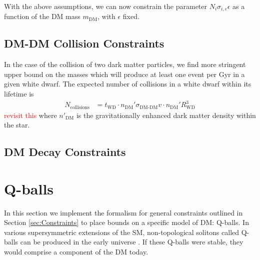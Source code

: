 \documentclass[twocolumn,showpacs,preprintnumbers,amsmath,amssymb,prd]{revtex4}
\begin{document}
With the above assumptions, we can now constrain the parameter $N_i \sigma_{i,\epsilon} \epsilon$ as a function of the DM mass $m_\text{DM}$, with $\epsilon$ fixed. 


\subsection{DM-DM Collision Constraints}
\label{sec:CollisionConstraints}

In the case of the collision of two dark matter particles, we find more stringent upper bound on the masses which will produce at least one event per Gyr in a given white dwarf. The expected number of collisions in a white dwarf within its lifetime is
\begin{align}
N_\text{collisions}  &= t_\text{WD} \cdot n_\text{DM}' \sigma_\text{DM-DM} v \cdot n_\text{DM}'R_\text{WD}^3
\end{align}
\textcolor{red}{revisit this}
where $n'_\text{DM}$ is the gravitationally enhanced dark matter density within the star.


\subsection{DM Decay Constraints}
\label{sec:DecayConstraints}




\section{Q-balls}
\label{sec:ConcreteExamples}

In this section we implement the formalism for general constraints outlined in Section \ref{sec:Constraints} to place bounds on a specific model of DM: Q-balls. In various supersymmetric extensions of the SM, non-topological solitons called Q-balls can be produced in the early universe \cite{Coleman:1985ki, Kusenko:1997si}. If these Q-balls were stable, they would comprise a component of the DM today.
\end{document}
